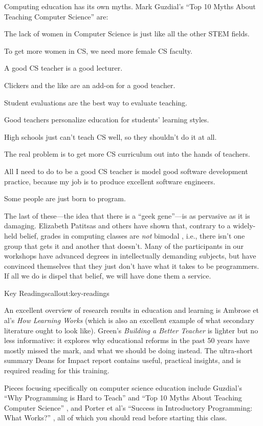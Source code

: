 Computing education has its own myths. Mark Guzdial's
``Top 10 Myths About Teaching Computer Science'' \cite{bib:guzdial-top10} are:

The lack of women in Computer Science is just like all the other STEM
fields.

To get more women in CS, we need more female CS faculty.

A good CS teacher is a good lecturer.

Clickers and the like are an add-on for a good teacher.

Student evaluations are the best way to evaluate teaching.

Good teachers personalize education for students' learning styles.

High schools just can't teach CS well, so they shouldn't do it at all.

The real problem is to get more CS curriculum out into the hands of
teachers.

All I need to do to be a good CS teacher is model good software
development practice, because my job is to produce excellent software
engineers.

Some people are just born to program.

The last of these---the idea that there is a ``geek gene''---is as
pervasive as it is damaging. Elizabeth Patitsas and others have shown
that, contrary to a widely-held belief,
grades in computing classes are \emph{not} bimodal \cite{bib:patitsas-cs-grades},
i.e., there isn't one group that gets
it and another that doesn't. Many of the participants in our workshops
have advanced degrees in intellectually demanding subjects, but have
convinced themselves that they just don't have what it takes to be
programmers. If all we do is dispel that belief, we will have done them
a service.

\begin{callout}{Key Readings}{callout:key-readings}

An excellent overview of research results in education and learning is
Ambrose et al's
\textit{How Learning Works} \cite{bib:ambrose-hlw} (which is also an excellent example of what secondary
literature ought to look like).  Green's
\textit{Building a Better Teacher} \cite{bib:greene-babt} is lighter but no less informative: it explores why
educational reforms in the past 50 years have mostly missed the mark,
and what we should be doing instead. The ultra-short summary
Deans for Impact report \cite{bib:deans-for-impact} contains useful, practical insights, and is
required reading for this training.

Pieces focusing specifically on computer science education include
Guzdial's
``Why Programming is Hard to Teach'' \cite{bib:guzdial-hard} and
``Top 10 Myths About Teaching Computer Science'' \cite{bib:guzdial-top10},
and Porter et al's ``Success in Introductory Programming: What Works?'' \cite{bib:porter-what-works},
all of which you should read before starting this class.
\end{callout}

